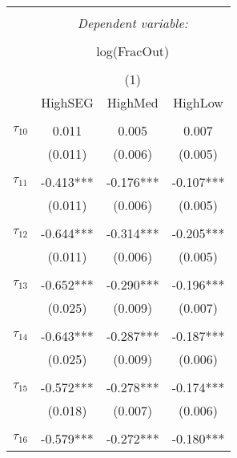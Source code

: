\begin{tabular}{@{\extracolsep{-0pt}}lccc} 
\\[-1.8ex]\hline 
\hline \\[-1.8ex] 
 & \multicolumn{3}{c}{\textit{Dependent variable:}} \\ 
\cline{2-4} 
\\[-1.8ex] & \multicolumn{3}{c}{log(FracOut)}\\ 
\\[-1.8ex] & \multicolumn{3}{c}{(1)} \\ 
\cline{2-4}
        & HighSEG & HighMed & HighLow  \\
\hline \\[-1.8ex] 
$\tau_{10}$     &   0.011   &   0.005   &   0.007   \\
                &  (0.011)  &  (0.006)  &  (0.005)  \\
                &           &           &           \\[-2.1ex]
$\tau_{11}$     & -0.413*** & -0.176*** & -0.107*** \\
                &  (0.011)  &  (0.006)  &  (0.005)  \\
                &           &           &           \\[-2.1ex]
$\tau_{12}$     & -0.644*** & -0.314*** & -0.205*** \\
                &  (0.011)  &  (0.006)  &  (0.005)  \\
                &           &           &           \\[-2.1ex]
$\tau_{13}$     & -0.652*** & -0.290*** & -0.196*** \\
                &  (0.025)  &  (0.009)  &  (0.007)  \\
                &           &           &           \\[-2.1ex]
$\tau_{14}$     & -0.643*** & -0.287*** & -0.187*** \\
                &  (0.025)  &  (0.009)  &  (0.006)  \\
                &           &           &           \\[-2.1ex]
$\tau_{15}$     & -0.572*** & -0.278*** & -0.174*** \\
                &  (0.018)  &  (0.007)  &  (0.006)  \\
                &           &           &           \\[-2.1ex]
$\tau_{16}$     & -0.579*** & -0.272*** & -0.180*** \\

\end{tabular}
